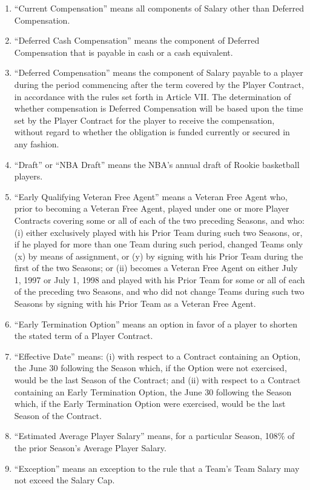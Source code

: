 \documentclass[
]{book}
\begin{document}
\begin{enumerate}
\item
  ``Current Compensation'' means all components of Salary other than Deferred Compensation.
\item
  ``Deferred Cash Compensation'' means the component of Deferred Compensation that is payable in cash or a cash equivalent.
\item
  ``Deferred Compensation'' means the component of Salary payable to a player during the period commencing after the term covered by the Player Contract, in accordance with the rules set forth in Article VII. The determination of whether compensation is Deferred Compensation will be based upon the time set by the Player Contract for the player to receive the compensation, without regard to whether the obligation is funded currently or secured in any fashion.
\item
  ``Draft'' or ``NBA Draft'' means the NBA's annual draft of Rookie basketball players.
\item
  ``Early Qualifying Veteran Free Agent'' means a Veteran Free Agent who, prior to becoming a Veteran Free Agent, played under one or more Player Contracts covering some or all of each of the two preceding Seasons, and who: (i) either exclusively played with his Prior Team during such two Seasons, or, if he played for more than one Team during such period, changed Teams only (x) by means of assignment, or (y) by signing with his Prior Team during the first of the two Seasons; or (ii) becomes a Veteran Free Agent on either July 1, 1997 or July 1, 1998 and played with his Prior Team for some or all of each of the preceding two Seasons, and who did not change Teams during such two Seasons by signing with his Prior Team as a Veteran Free Agent.
\item
  ``Early Termination Option'' means an option in favor of a player to shorten the stated term of a Player Contract.
\item
  ``Effective Date'' means: (i) with respect to a Contract containing an Option, the June 30 following the Season which, if the Option were not exercised, would be the last Season of the Contract; and (ii) with respect to a Contract containing an Early Termination Option, the June 30 following the Season which, if the Early Termination Option were exercised, would be the last Season of the Contract.
\item
  ``Estimated Average Player Salary'' means, for a particular Season, 108\% of the prior Season's Average Player Salary.
\item
  ``Exception'' means an exception to the rule that a Team's Team Salary may not exceed the Salary Cap.

\end{enumerate}
\end{document}

